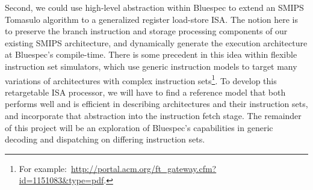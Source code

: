\documentclass[12pt]{article}
\begin{document}
  Second, we could use high-level abstraction within Bluespec to extend an SMIPS Tomasulo algorithm to a generalized register load-store ISA. The notion here is to preserve the branch instruction and storage processing components of our existing SMIPS architecture, and dynamically generate the execution architecture at Bluespec's compile-time. There is some precedent in this idea within flexible instruction set simulators, which use generic instruction models to target many variations of architectures with complex instruction sets\footnote{For example:~\url{http://portal.acm.org/ft_gateway.cfm?id=1151083&type=pdf}.}. To develop this retargetable ISA processor, we will have to find a reference model that both performs well and is efficient in describing architectures and their instruction sets, and incorporate that abstraction into the instruction fetch stage. The remainder of this project will be an exploration of Bluespec's capabilities in generic decoding and dispatching on differing instruction sets.
  
\end{document}
